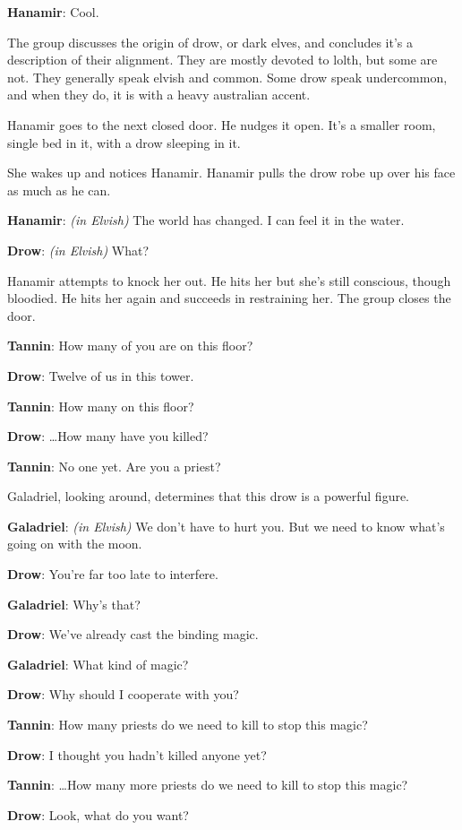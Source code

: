 \documentclass[smalldemyvopaper,11pt,twoside,onecolumn,openright,extrafontsizes]{memoir}
\begin{document}
\textbf{Hanamir}: Cool.

The group discusses the origin of drow, or dark elves, and concludes
it's a description of their alignment. They are mostly devoted to lolth,
but some are not. They generally speak elvish and common. Some drow
speak undercommon, and when they do, it is with a heavy australian
accent.

Hanamir goes to the next closed door. He nudges it open. It's a smaller
room, single bed in it, with a drow sleeping in it.

She wakes up and notices Hanamir. Hanamir pulls the drow robe up over
his face as much as he can.

\textbf{Hanamir}: \emph{(in Elvish)} The world has changed. I can feel
it in the water.

\textbf{Drow}: \emph{(in Elvish)} What?

Hanamir attempts to knock her out. He hits her but she's still
conscious, though bloodied. He hits her again and succeeds in
restraining her. The group closes the door.

\textbf{Tannin}: How many of you are on this floor?

\textbf{Drow}: Twelve of us in this tower.

\textbf{Tannin}: How many on this floor?

\textbf{Drow}: \ldots How many have you killed?

\textbf{Tannin}: No one yet. Are you a priest?

Galadriel, looking around, determines that this drow is a powerful
figure.

\textbf{Galadriel}: \emph{(in Elvish)} We don't have to hurt you. But we
need to know what's going on with the moon.

\textbf{Drow}: You're far too late to interfere.

\textbf{Galadriel}: Why's that?

\textbf{Drow}: We've already cast the binding magic.

\textbf{Galadriel}: What kind of magic?

\textbf{Drow}: Why should I cooperate with you?

\textbf{Tannin}: How many priests do we need to kill to stop this magic?

\textbf{Drow}: I thought you hadn't killed anyone yet?

\textbf{Tannin}: \ldots How many more priests do we need to kill to stop
this magic?

\textbf{Drow}: Look, what do you want?
\end{document}
